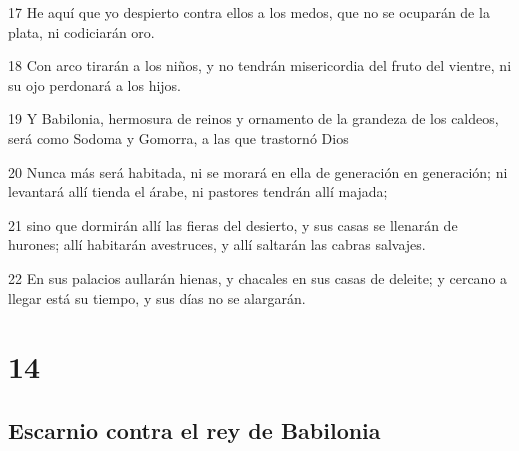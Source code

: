 \par 17 He aquí que yo despierto contra ellos a los medos, que no se ocuparán de la plata, ni codiciarán oro.
\par 18 Con arco tirarán a los niños, y no tendrán misericordia del fruto del vientre, ni su ojo perdonará a los hijos.
\par 19 Y Babilonia, hermosura de reinos y ornamento de la grandeza de los caldeos, será como Sodoma y Gomorra, a las que trastornó Dios 
\par 20 Nunca más será habitada, ni se morará en ella de generación en generación; ni levantará allí tienda el árabe, ni pastores tendrán allí majada;
\par 21 sino que dormirán allí las fieras del desierto, y sus casas se llenarán de hurones; allí habitarán avestruces, y allí saltarán las cabras salvajes.
\par 22 En sus palacios aullarán hienas, y chacales en sus casas de deleite; y cercano a llegar está su tiempo, y sus días no se alargarán.

\chapter{14}

\section*{Escarnio contra el rey de Babilonia}

